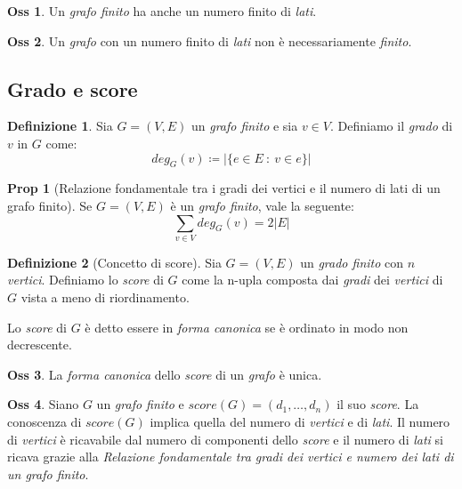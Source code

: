 \documentclass[12pt, a4paper]{report}
\theoremstyle{definition}
\newtheorem{definition}{Definizione}[section]
\newtheorem{observation}{Oss}[section]
\newtheorem*{proposition}{Prop}
\begin{document}
\begin{observation}
    Un \emph{grafo finito} ha anche un numero finito di \emph{lati}.
\end{observation}
\begin{observation}
    Un \emph{grafo} con un numero finito di \emph{lati} non è necessariamente
    \emph{finito}.
\end{observation}

\subsection{Grado e score}

\begin{definition}
    Sia $G=(V,E)$ un \emph{grafo finito} e sia $v\in V$. Definiamo il \emph{grado}
    di $v$ in $G$ come:
    \[deg_G(v)\coloneqq|\{e\in E\ :\ v\in e\}|\]
\end{definition}

\begin{proposition}[Relazione fondamentale tra i gradi dei vertici e il numero di
    lati di un grafo finito]
    Se $G=(V,E)$ è un \emph{grafo finito}, vale la seguente:
    \[\sum_{v\in V}deg_G(v)=2|E|\]
\end{proposition}

\begin{definition}[Concetto di score]
    Sia $G=(V,E)$ un \emph{grado finito} con $n$ \emph{vertici}. Definiamo lo
    \emph{score} di $G$ come la n-upla composta dai \emph{gradi} dei \emph{vertici}
    di $G$ vista a meno di riordinamento.

    Lo \emph{score} di $G$ è detto essere in \emph{forma canonica} se è ordinato in
    modo non decrescente.
\end{definition}

\begin{observation}
    La \emph{forma canonica} dello \emph{score} di un \emph{grafo} è unica.
\end{observation}

\begin{observation}
    Siano $G$ un \emph{grafo finito} e $score(G)=(d_1,\dots,d_n)$ il suo \emph{score}.
    La conoscenza di $score(G)$ implica quella del numero di \emph{vertici} e di
    \emph{lati}. Il numero di \emph{vertici} è ricavabile dal numero di componenti
    dello \emph{score} e il numero di \emph{lati} si ricava grazie alla \emph{Relazione
    fondamentale tra gradi dei vertici e numero dei lati di un grafo finito}.
\end{observation}
\end{document}
